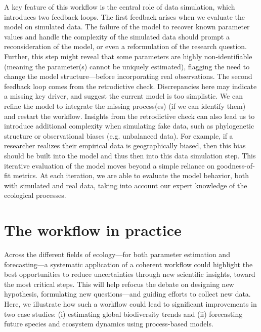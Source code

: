 \documentclass[11pt]{article}
\begin{document}
A key feature of this workflow is the central role of data simulation, which introduces two feedback loops. The first feedback arises when we evaluate the model on simulated data.
The failure of the model to recover known parameter values and handle the complexity of the simulated data should prompt a reconsideration of the model, or even a reformulation of the research question.
Further, this step might reveal that some parameters are highly non-identifiable (meaning the parameter(s) cannot be uniquely estimated),
flagging the need to change the model structure---before incorporating real observations. 
The second feedback loop comes from the retrodictive check. 
Discrepancies here may indicate a missing key driver, and suggest the current model is too simplistic. We can refine the model to integrate the missing process(es) (if we can identify them) and restart the workflow. Insights from the retrodictive check can also lead us to introduce additional complexity when simulating fake data, such as phylogenetic structure or observational biases (e.g. unbalanced data). For example, if a researcher realizes their empirical data is geographically biased, then this bias should be built into the model and thus then into this data simulation step. This iterative evaluation of the model moves beyond a simple reliance on goodness-of-fit metrics. At each iteration, we are able to evaluate the model behavior, both with simulated and real data, taking into account our expert knowledge of the ecological processes. 

\section{The workflow in practice}

Across the different fields of ecology---for both parameter estimation and forecasting---a systematic application of a coherent workflow could highlight the best opportunities to reduce uncertainties through new scientific insights, toward the most critical steps. This will help refocus the debate on designing new hypothesis, formulating new questions---and guiding efforts to collect new data. Here, we illustrate how such a workflow could lead to significant improvements in two case studies: (i) estimating global biodiversity trends and (ii) forecasting future species and ecosystem dynamics using process-based models.
\end{document}
